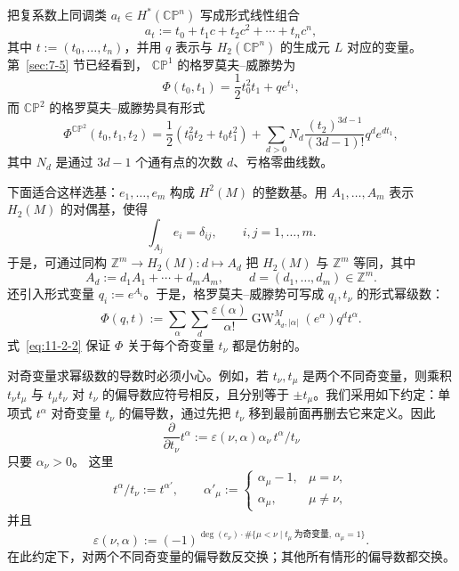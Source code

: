 \begin{example}\label{ex:11-2-1}
把复系数上同调类 $a_t\in H^*(\mathbb{CP}^n)$ 写成形式线性组合
\[
  a_t:=t_0+t_1c+t_2c^2+\cdots+t_nc^n,
\]
其中 $t:=(t_0,\ldots,t_n)$，并用 $q$ 表示与
$H_2(\mathbb{CP}^n)$ 的生成元 $L$ 对应的变量。第~\ref{sec:7-5} 节已经看到，
$\mathbb{CP}^1$ 的格罗莫夫--威滕势为
\[
  \Phi(t_0,t_1)=\frac12t_0^2t_1+qe^{t_1},
\]
而 $\mathbb{CP}^2$ 的格罗莫夫--威滕势具有形式
\[
  \Phi^{\mathbb{CP}^2}(t_0,t_1,t_2)
  =\frac12(t_0^2t_2+t_0t_1^2)
  +\sum_{d>0}N_d\frac{(t_2)^{3d-1}}{(3d-1)!}q^de^{dt_1},
\]
其中 $N_d$ 是通过 $3d-1$ 个通有点的次数 $d$、亏格零曲线数。
\end{example}

下面适合这样选基：$e_1,\ldots,e_m$ 构成 $H^2(M)$ 的整数基。用
$A_1,\ldots,A_m$ 表示 $H_2(M)$ 的对偶基，使得
\[
  \int_{A_j}e_i=\delta_{ij},\qquad i,j=1,\ldots,m.
\]
于是，可通过同构 $\mathbb Z^m\to H_2(M):d\mapsto A_d$ 把 $H_2(M)$ 与 $\mathbb Z^m$
等同，其中
\[
  A_d:=d_1A_1+\cdots+d_mA_m,\qquad
  d=(d_1,\ldots,d_m)\in\mathbb Z^m.
\]
还引入形式变量 $q_i:=e^{A_i}$。于是，格罗莫夫--威滕势可写成 $q_i,t_\nu$ 的形式幂级数：
\begin{equation}\label{eq:11-2-7}
  \Phi(q,t):=\sum_\alpha\sum_d\frac{\varepsilon(\alpha)}{\alpha!}
  \operatorname{GW}_{A_d,|\alpha|}^M(e^\alpha)q^dt^\alpha.
\end{equation}
式~\eqref{eq:11-2-2} 保证 $\Phi$ 关于每个奇变量 $t_\nu$ 都是仿射的。

\begin{remark}\label{rem:11-2-2}
对奇变量求幂级数的导数时必须小心。例如，若 $t_\nu,t_\mu$ 是两个不同奇变量，则乘积
$t_\nu t_\mu$ 与 $t_\mu t_\nu$ 对 $t_\nu$ 的偏导数应符号相反，且分别等于
$\pm t_\mu$。我们采用如下约定：单项式 $t^\alpha$ 对奇变量 $t_\nu$ 的偏导数，通过先把
$t_\nu$ 移到最前面再删去它来定义。因此
\[
  \frac{\partial}{\partial t_\nu}t^\alpha
  :=\varepsilon(\nu,\alpha)\alpha_\nu\,t^\alpha/t_\nu
\]
只要 $\alpha_\nu>0$。
这里
\[
  t^\alpha/t_\nu:=t^{\alpha'},\qquad
  \alpha'_\mu:=
  \begin{cases}
  \alpha_\mu-1,&\mu=\nu,\\
  \alpha_\mu,&\mu\ne\nu,
  \end{cases}
\]
并且
\begin{equation}\label{eq:11-2-8}
  \varepsilon(\nu,\alpha):=
  (-1)^{\deg(e_\nu)\cdot
  \#\{\mu<\nu\mid t_\mu\ \text{为奇变量},\ \alpha_\mu=1\}}.
\end{equation}
在此约定下，对两个不同奇变量的偏导数反交换；其他所有情形的偏导数都交换。
\end{remark}

